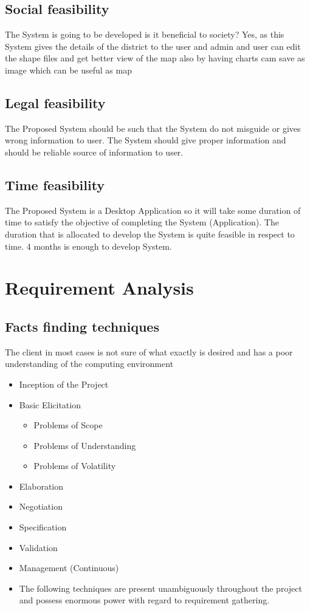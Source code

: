 \subsection{Social feasibility}
The System is going to be developed is it beneficial to society? Yes, as this System gives the details of the district to the user and admin and user can edit the shape files and get better view of the map also by having charts cam save as image which can be useful as map
\subsection{Legal feasibility}
The Proposed System should be such that the System do not misguide or gives wrong information to user. The System should give proper information and should be reliable source of information to user.
\subsection{Time feasibility}
The Proposed System is a Desktop  Application so it will take some duration of time to satisfy the objective of completing the System (Application). The duration that is allocated to develop the System is quite feasible in respect to time. 4 months is enough to develop System.

\section{Requirement Analysis}
\subsection{Facts finding techniques}
The client in most cases is not sure of what exactly is desired and has a poor understanding of the computing environment
\begin{itemize}
\item Inception of the Project
\item Basic Elicitation
\begin{itemize}
\item Problems of Scope
\item Problems of Understanding
\item Problems of Volatility
\end{itemize}
\item Elaboration
\item Negotiation
\item Specification
\item Validation
\item Management (Continuous)
\item The  following  techniques  are  present  unambiguously  throughout  the  project  and possess enormous power with regard to requirement gathering.
\end{itemize}

